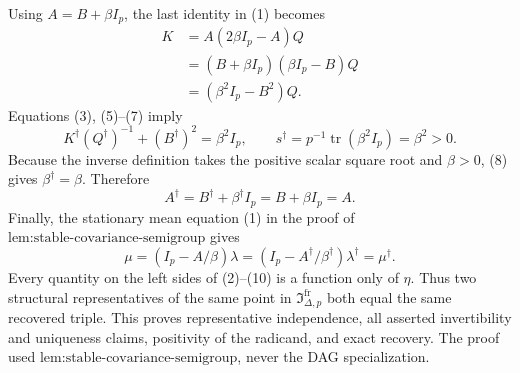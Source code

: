 Using \(A=B+\beta I_p\), the last identity in (1) becomes
\[
 \begin{aligned}
 K
 &=A(2\beta I_p-A)Q\\
 &=(B+\beta I_p)(\beta I_p-B)Q\\
 &=(\beta^2I_p-B^2)Q.
 \end{aligned}
\tag{7}
\]
Equations (3), (5)--(7) imply
\[
 K^\dagger(Q^\dagger)^{-1}+(B^\dagger)^2=\beta^2I_p,
 \qquad
 s^\dagger=p^{-1}\operatorname{tr}(\beta^2I_p)=\beta^2>0.
\tag{8}
\]
Because the inverse definition takes the positive scalar square root and \(\beta>0\), (8) gives \(\beta^\dagger=\beta\).  Therefore
\[
 A^\dagger=B^\dagger+\beta^\dagger I_p=B+\beta I_p=A.
\tag{9}
\]
Finally, the stationary mean equation (1) in the proof of \(\text{lem:stable-covariance-semigroup}\) gives
\[
 \mu=(I_p-A/\beta)\lambda
 =(I_p-A^\dagger/\beta^\dagger)\lambda^\dagger=\mu^\dagger.
\tag{10}
\]
Every quantity on the left sides of (2)--(10) is a function only of \(\eta\).  Thus two structural representatives of the same point in \(\mathfrak I_{\Delta,p}^{\mathrm{fr}}\) both equal the same recovered triple.  This proves representative independence, all asserted invertibility and uniqueness claims, positivity of the radicand, and exact recovery.  The proof used \(\text{lem:stable-covariance-semigroup}\), never the DAG specialization.